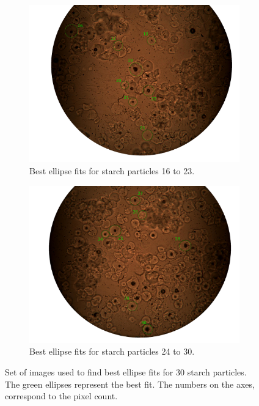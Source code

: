 \begin{figure}[h!]
    \medskip
    \begin{subfigure}[b]{0.475\textwidth}
        \centering
        \includegraphics[width=\textwidth]{afbeeldingen/size/zetmeel/zetmeel_5.png}
        \caption{Best ellipse fits for starch particles 16 to 23.}   
        \label{fig_zetmeel_5}
    \end{subfigure}
    \hspace*{\fill}
    \begin{subfigure}[b]{0.475\textwidth}
        \centering
        \includegraphics[width=\textwidth]{afbeeldingen/size/zetmeel/zetmeel_6.png}
        \caption{Best ellipse fits for starch particles 24 to 30.}   
        \label{fig_zetmeel_6}
    \end{subfigure}
    
    \caption{Set of images used to find best ellipse fits for 30 starch particles. The green ellipses represent the best fit. The numbers on the axes, correspond to the pixel count.} 
	\label{fig_zetmeel}
\end{figure}
